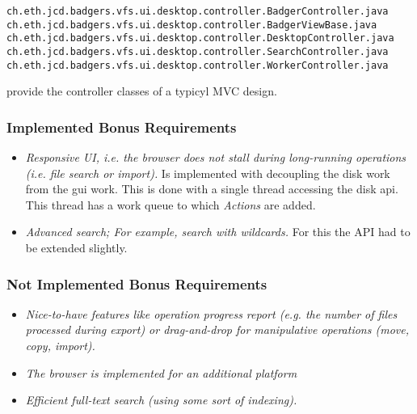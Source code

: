 \begin{verbatim}
ch.eth.jcd.badgers.vfs.ui.desktop.controller.BadgerController.java
ch.eth.jcd.badgers.vfs.ui.desktop.controller.BadgerViewBase.java
ch.eth.jcd.badgers.vfs.ui.desktop.controller.DesktopController.java
ch.eth.jcd.badgers.vfs.ui.desktop.controller.SearchController.java
ch.eth.jcd.badgers.vfs.ui.desktop.controller.WorkerController.java
\end{verbatim} provide the controller classes of a typicyl MVC design. 


\subsubsection {Implemented Bonus Requirements}
\begin{itemize}
  \item \emph{Responsive UI, i.e. the browser does not stall during long-running
  operations (i.e. file search or import).} Is implemented with decoupling the
  disk work from the gui work. This is done with a single thread accessing the
  disk api. This thread has a work queue to which \textit{Actions} are added.
  \item \emph{Advanced search; For example, search with wildcards.} For this the
  API had to be extended slightly.
\end{itemize}

\subsubsection {Not Implemented Bonus Requirements}
\begin{itemize}
  \item \emph{Nice-to-have features like operation progress report (e.g. the
  number of files processed during export) or drag-and-drop for manipulative
  operations (move, copy, import).}
  \item \emph{The browser is implemented for an additional platform}
  \item \emph{Efficient full-text search (using some sort of indexing).}
\end{itemize}
